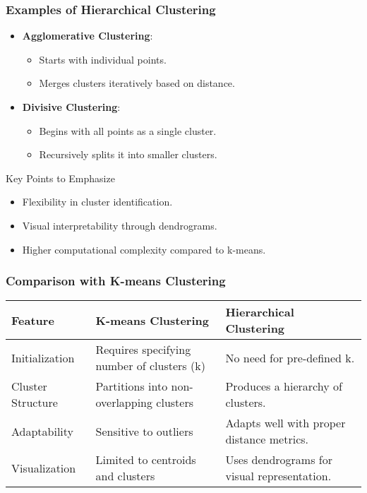 \documentclass[aspectratio=169]{beamer}
\begin{document}
\begin{frame}[fragile]
    \frametitle{Examples of Hierarchical Clustering}
    \begin{itemize}
        \item \textbf{Agglomerative Clustering}:
            \begin{itemize}
                \item Starts with individual points.
                \item Merges clusters iteratively based on distance.
            \end{itemize}
        \item \textbf{Divisive Clustering}:
            \begin{itemize}
                \item Begins with all points as a single cluster.
                \item Recursively splits it into smaller clusters.
            \end{itemize}
    \end{itemize}
    
    \begin{block}{Key Points to Emphasize}
        \begin{itemize}
            \item Flexibility in cluster identification.
            \item Visual interpretability through dendrograms.
            \item Higher computational complexity compared to k-means.
        \end{itemize}
    \end{block}
\end{frame}

\begin{frame}[fragile]
    \frametitle{Comparison with K-means Clustering}
    \begin{table}[]
        \centering
        \begin{tabular}{|l|l|l|}
            \hline
            \textbf{Feature} & \textbf{K-means Clustering}                & \textbf{Hierarchical Clustering}            \\ \hline
            Initialization           & Requires specifying number of clusters (k) & No need for pre-defined k.                  \\ \hline
            Cluster Structure         & Partitions into non-overlapping clusters    & Produces a hierarchy of clusters.             \\ \hline
            Adaptability              & Sensitive to outliers                       & Adapts well with proper distance metrics.     \\ \hline
            Visualization             & Limited to centroids and clusters          & Uses dendrograms for visual representation.   \\ \hline
        \end{tabular}
    \end{table}
\end{frame}
\end{document}
